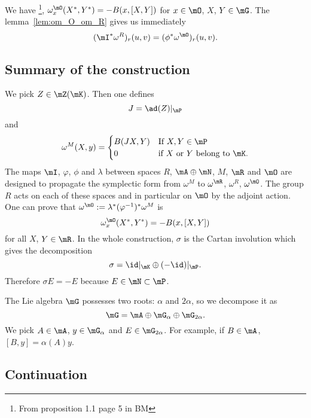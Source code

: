 We have \footnote{From proposition 1.1 page 5 in BM}, $\omega_x^{\mO}(X^*,Y^*)=-B(x,[X,Y])$ for $x\in\mO$, $X$, $Y\in\mG$. The lemma~\ref{lem:om_O_om_R} gives us immediately
\[
   (\mI^*\omega^R)_r(u,v)=(\phi^*\omega^{\mO})_r(u,v).
\]
\subsection{Summary of the construction}

We pick $Z\in\mZ(\mK)$. Then one defines
\[
  J=\ad(Z)|_{\mP}
\]
and
\[
  \omega^M(X,y)=
\begin{cases}
 B(JX,Y)&\text{If }X,Y\in\mP\\
 0&\text{if }X \text{ or } Y \text{ belong to }\mK.
\end{cases}
\]
The maps $\mI$, $\varphi$, $\phi$ and $\lambda$ between spaces $R$, $\mA\oplus\mN$, $M$, $\mR$ and $\mO$ are designed to propagate the symplectic form from $\omega^M$ to $\omega^{\mR}$, $\omega^R$, $\omega^{\mO}$. The group $R$ acts on each of these spaces and in particular on $\mO$ by the adjoint action. One can prove that $\omega^{\mO}:=\lambda^*(\varphi^{-1})^*\omega^M$ is
\[
  \omega^{\mO}_x(X^*,Y^*)=-B(x,[X,Y])
\]
for all $X$, $Y\in\mR$. In the whole construction, $\sigma$ is the Cartan involution which gives the decomposition
\[
  \sigma=\id|_{\mK}\oplus(-\id)|_{\mP}.
\]
Therefore $\sigma E=-E$ because $E\in\mN\subset\mP$.

The Lie algebra $\mG$ possesses two roots: $\alpha$ and $2\alpha$, so we decompose it as
\[
  \mG=\mA\oplus\mG_{\alpha}\oplus\mG_{2\alpha}.
\]
We pick $A\in\mA$, $y\in\mG_{\alpha}$ and $E\in\mG_{2\alpha}$. For example, if $B\in \mA$, $[B,y]=\alpha(A)y$.

\subsection{Continuation}


